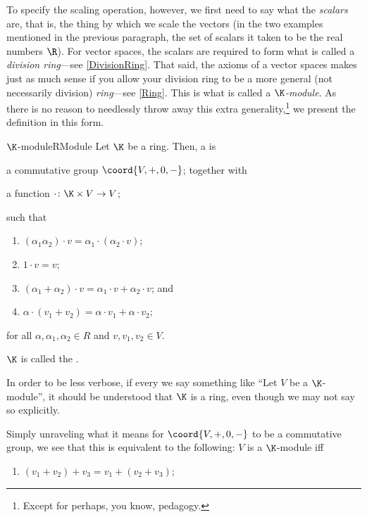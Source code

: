To specify the scaling operation, however, we first need to say what the \emph{scalars} are, that is, the thing by which we scale the vectors (in the two examples mentioned in the previous paragraph, the set of scalars it taken to be the real numbers $\R$).  For vector spaces, the scalars are required to form what is called a \emph{division ring}---see \cref{DivisionRing}.  That said, the axioms of a vector spaces makes just as much sense if you allow your division ring to be a more general (not necessarily division) \emph{ring}---see \cref{Ring}.  This is what is called a \emph{$\K$-module}.  As there is no reason to needlessly throw away this extra generality,\footnote{Except for perhaps, you know, pedagogy.} we present the definition in this form.
\begin{dfn}{$\K$-module}{RModule}
	Let $\K$ be a ring.  Then, a   is
	\begin{data}
		\item a commutative group $\coord{V,+,0,-}$; together with
		\item a function $\cdot \colon \K\times V\rightarrow V$;
	\end{data}
	such that
	\begin{enumerate}
		\item $(\alpha _1\alpha _2)\cdot v=\alpha _1\cdot (\alpha _2\cdot v)$;
		\item $1\cdot v=v$;
		\item $(\alpha _1+\alpha _2)\cdot v=\alpha _1\cdot v+\alpha _2\cdot v$; and
		\item $\alpha \cdot (v_1+v_2)=\alpha \cdot v_1+\alpha \cdot v_2$;
	\end{enumerate}
	for all $\alpha ,\alpha _1,\alpha _2\in R$ and $v,v_1,v_2\in V$.
	\begin{rmk}
		$\K$ is called the .
	\end{rmk}
	\begin{rmk}
		In order to be less verbose, if every we say something like ``Let $V$ be a $\K$-module\textellipsis '', it should be understood that $\K$ is a ring, even though we may not say so explicitly.
	\end{rmk}
	\begin{rmk}
		Simply unraveling what it means for $\coord{V,+,0,-}$ to be a commutative group, we see that this is equivalent to the following:  $V$ is a $\K$-module iff
		\begin{enumerate}
			\item $(v_1+v_2)+v_3=v_1+(v_2+v_3)$;

\end{enumerate}
\end{rmk}
\end{dfn}
